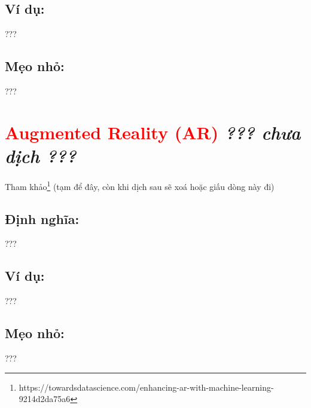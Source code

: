 \subsection*{Ví dụ:}
???
\subsection*{Mẹo nhỏ:}
???
\section*{\huge \textcolor{Red}{Augmented Reality (AR)}  \small \textit{??? chưa dịch ???} }
Tham khảo\footnote{https://towardsdatascience.com/enhancing-ar-with-machine-learning-9214d2da75a6} (tạm để đây, còn khi dịch sau sẽ xoá hoặc giấu dòng này đi)
\subsection*{Định nghĩa:}
???
\subsection*{Ví dụ:}
???
\subsection*{Mẹo nhỏ:}
???

